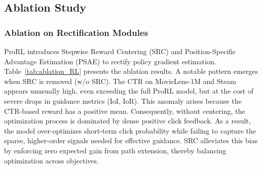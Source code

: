 \subsection{Ablation Study}
\subsubsection{Ablation on Rectification Modules}
\label{sec:ablation_component}
ProRL introduces Stepwise Reward Centering (SRC) and Position-Specific Advantage Estimation (PSAE) to rectify policy gradient estimation. Table~\ref{tab:ablation_RL} presents the ablation results. A notable pattern emerges when SRC is removed (w/o SRC). The CTR on MovieLens-1M and Steam appears unusually high, even exceeding the full ProRL model, but at the cost of severe drops in guidance metrics (IoI, IoR). This anomaly arises because the CTR-based reward has a positive mean. Consequently, without centering, the optimization process is dominated by dense positive click feedback. As a result, the model over-optimizes short-term click probability while failing to capture the sparse, higher-order signals needed for effective guidance. SRC alleviates this bias by enforcing zero expected gain from path extension, thereby balancing optimization across objectives.

\begin{table}[t]
  \centering
  \caption{Ablation Studies on ProRL}
  \label{tab:ablation_RL}
\end{table}


